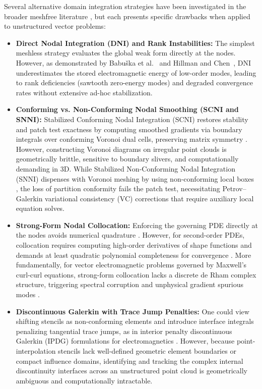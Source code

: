 \documentclass[VANCOUVER,Times1COL]{WileyNJD-v5}
\begin{document}
Several alternative domain integration strategies have been investigated in the broader meshfree literature \cite{hillman2018performance}, but each presents specific drawbacks when applied to unstructured vector problems:
\begin{itemize}
    \item \textbf{Direct Nodal Integration (DNI) and Rank Instabilities:} The simplest meshless strategy evaluates the global weak form directly at the nodes. However, as demonstrated by Babu{\v{s}}ka et al.~\cite{babuska2008quadrature} and Hillman and Chen~\cite{hillman2018performance}, DNI underestimates the stored electromagnetic energy of low-order modes, leading to rank deficiencies (sawtooth zero-energy modes) and degraded convergence rates without extensive ad-hoc stabilization.
    \item \textbf{Conforming vs. Non-Conforming Nodal Smoothing (SCNI and SNNI):} Stabilized Conforming Nodal Integration (SCNI) \cite{chen2001stabilized} restores stability and patch test exactness by computing smoothed gradients via boundary integrals over conforming Voronoi dual cells, preserving matrix symmetry \cite{hillman2018performance}. However, constructing Voronoi diagrams on irregular point clouds is geometrically brittle, sensitive to boundary slivers, and computationally demanding in 3D. While Stabilized Non-Conforming Nodal Integration (SNNI) dispenses with Voronoi meshing by using non-conforming local boxes \cite{hillman2018performance}, the loss of partition conformity fails the patch test, necessitating Petrov--Galerkin variational consistency (VC) corrections \cite{chen2013arbitrary, hillman2018performance} that require auxiliary local equation solves.
    \item \textbf{Strong-Form Nodal Collocation:} Enforcing the governing PDE directly at the nodes avoids numerical quadrature \cite{hillman2018performance}. However, for second-order PDEs, collocation requires computing high-order derivatives of shape functions and demands at least quadratic polynomial completeness for convergence \cite{hillman2018performance}. More fundamentally, for vector electromagnetic problems governed by Maxwell's curl-curl equations, strong-form collocation lacks a discrete de Rham complex structure, triggering spectral corruption and unphysical gradient spurious modes \cite{bossavit1990spurious, boffi2006finite}.
    \item \textbf{Discontinuous Galerkin with Trace Jump Penalties:} One could view shifting stencils as non-conforming elements and introduce interface integrals penalizing tangential trace jumps, as in interior penalty discontinuous Galerkin (IPDG) formulations for electromagnetics \cite{houston2004mixed, hesthaven2004high}. However, because point-interpolation stencils lack well-defined geometric element boundaries or compact influence domains, identifying and tracking the complex internal discontinuity interfaces across an unstructured point cloud is geometrically ambiguous and computationally intractable.

\end{itemize}
\end{document}
